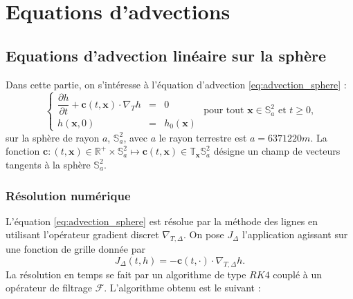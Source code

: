 
\chapter{Equations d'advections}

\section{Equations d'advection linéaire sur la sphère}

Dans cette partie, on s'intéresse à l'équation d'advection \eqref{eq:advection_sphere} :
\begin{equation}
\left\lbrace
\begin{array}{rcl}
\dfrac{\partial h}{\partial t} + \mathbf{c}(t,\mathbf{x}) \cdot \nabla_T h & = & 0 \\
h(\mathbf{x},0) & = & h_0(\mathbf{x})
\end{array}
\right. \text{ pour tout } \mathbf{x} \in \mathbb{S}_a^2 \text{ et } t \geq 0,
\label{eq:advection_sphere}
\end{equation}
sur la sphère de rayon $a$, $\mathbb{S}_a^2$, avec $a$ le rayon terrestre est $a = 6 371 220 \si{m}$.
La fonction $\mathbf{c} : (t,\mathbf{x}) \in \mathbb{R}^+ \times \mathbb{S}_a^2 \mapsto \mathbf{c}(t,\mathbf{x}) \in \mathbb{T}_{\mathbf{x}} \mathbb{S}_a^2$ désigne un champ de vecteurs tangents à la sphère $\mathbb{S}_a^2$.

\subsection{Résolution numérique}

L'équation \eqref{eq:advection_sphere} est résolue par la méthode des lignes en utilisant l'opérateur gradient discret $\nabla_{T,\Delta}$. On pose $J_{\Delta}$ l'application agissant sur une fonction de grille donnée par
\begin{equation}
J_{\Delta}(t, h) = - \mathbf{c}(t,\cdot) \cdot \nabla_{T,\Delta} h.
\end{equation}
La résolution en temps se fait par un algorithme de type $RK4$ couplé à un opérateur de filtrage $\mathcal{F}$. L'algorithme obtenu est le suivant :


